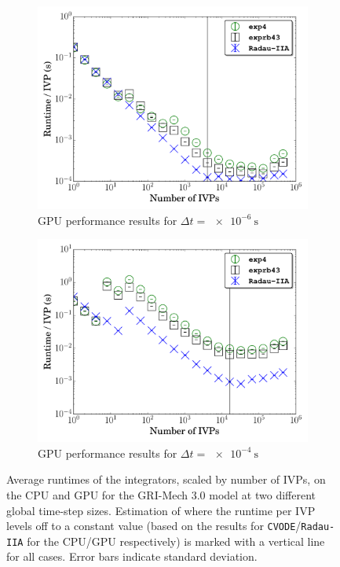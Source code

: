 \documentclass[preprint,review,11pt]{elsarticle}
\begin{document}
\begin{figure}[htbp]
\begin{subfigure}{0.49\textwidth}
      \includegraphics[width=\linewidth]{CH4_1e-06_gpu.pdf}
      \caption{GPU performance results for $\Delta t = \SI{e-6}{\second}$}
      \label{F:ch4_gpu_perf_small}
  \end{subfigure}
  \begin{subfigure}{0.49\textwidth}
      \includegraphics[width=\linewidth]{CH4_1e-04_gpu.pdf}
      \caption{GPU performance results for $\Delta t = \SI{e-4}{\second}$}
      \label{F:ch4_gpu_perf_large}
  \end{subfigure}
  \caption{Average runtimes of the integrators, scaled by number of IVPs, on the CPU and GPU for the GRI-Mech 3.0 model at two different global time-step sizes.
  Estimation of where the runtime per IVP levels off to a constant value (based on the results for \texttt{CVODE}\slash\texttt{Radau-IIA} for the CPU\slash GPU respectively) is marked with a vertical line for all cases.
  Error bars indicate standard deviation.}
  \label{F:CH4_perf}
\end{figure}
\end{document}
